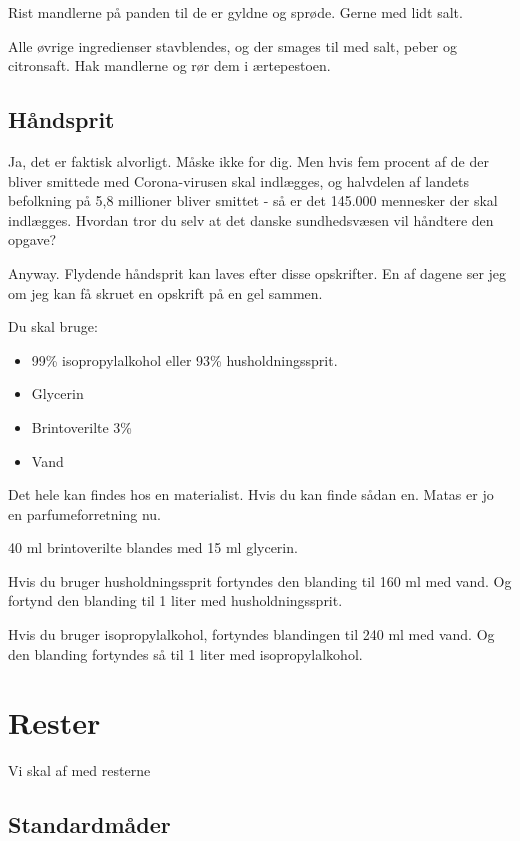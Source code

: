 \documentclass[
  letterpaper,
  DIV=11,
  numbers=noendperiod]{scrreprt}
\providecommand{\tightlist}{%
  \setlength{\itemsep}{0pt}\setlength{\parskip}{0pt}}\usepackage{longtable,booktabs,array}
\begin{document}
Rist mandlerne på panden til de er gyldne og sprøde. Gerne med lidt
salt.

Alle øvrige ingredienser stavblendes, og der smages til med salt, peber
og citronsaft. Hak mandlerne og rør dem i ærtepestoen.

\hypertarget{huxe5ndsprit}{%
\section{Håndsprit}\label{huxe5ndsprit}}

Ja, det er faktisk alvorligt. Måske ikke for dig. Men hvis fem procent
af de der bliver smittede med Corona-virusen skal indlægges, og
halvdelen af landets befolkning på 5,8 millioner bliver smittet - så er
det 145.000 mennesker der skal indlægges. Hvordan tror du selv at det
danske sundhedsvæsen vil håndtere den opgave?

Anyway. Flydende håndsprit kan laves efter disse opskrifter. En af
dagene ser jeg om jeg kan få skruet en opskrift på en gel sammen.

Du skal bruge:

\begin{itemize}
\tightlist
\item
  99\% isopropylalkohol eller 93\% husholdningssprit.
\item
  Glycerin
\item
  Brintoverilte 3\%
\item
  Vand
\end{itemize}

Det hele kan findes hos en materialist. Hvis du kan finde sådan en.
Matas er jo en parfumeforretning nu.

40 ml brintoverilte blandes med 15 ml glycerin.

Hvis du bruger husholdningssprit fortyndes den blanding til 160 ml med
vand. Og fortynd den blanding til 1 liter med husholdningssprit.

Hvis du bruger isopropylalkohol, fortyndes blandingen til 240 ml med
vand. Og den blanding fortyndes så til 1 liter med isopropylalkohol.


\hypertarget{rester}{%
\chapter{Rester}\label{rester}}

Vi skal af med resterne

\hypertarget{standardmuxe5der}{%
\section{Standardmåder}\label{standardmuxe5der}}
\end{document}
